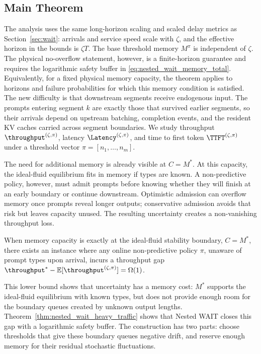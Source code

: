 \subsection{Main Theorem}
\label{subsec:nested_main_theorem}

The analysis uses the same long-horizon scaling and scaled delay metrics as Section~\ref{sec:wait}: arrivals and service speed scale with \(\zeta\), and the effective horizon in the bounds is \(\zeta T\). The base threshold memory \(M^\pi\) is independent of \(\zeta\). The physical no-overflow statement, however, is a finite-horizon guarantee and requires the logarithmic safety buffer in \eqref{eq:nested_wait_memory_total}. Equivalently, for a fixed physical memory capacity, the theorem applies to horizons and failure probabilities for which this memory condition is satisfied. The new difficulty is that downstream segments receive endogenous input. The prompts entering segment \(k\) are exactly those that survived earlier segments, so their arrivals depend on upstream batching, completion events, and the resident KV caches carried across segment boundaries. We study throughput \(\throughput^{(\zeta,\pi)}\), latency \(\Latency^{(\zeta,\pi)}\), and time to first token \(\TTFT^{(\zeta,\pi)}\) under a threshold vector \(\pi=[n_1,\dots,n_m]\).

The need for additional memory is already visible at \(C=M^*\). At this capacity, the ideal-fluid equilibrium fits in memory if types are known. A non-predictive policy, however, must admit prompts before knowing whether they will finish at an early boundary or continue downstream. Optimistic admission can overflow memory once prompts reveal longer outputs; conservative admission avoids that risk but leaves capacity unused. The resulting uncertainty creates a non-vanishing throughput loss.

\begin{proposition}
\label{prop:unknown_lower_bound}
When memory capacity is exactly at the ideal-fluid stability boundary, \(C=M^*\), there exists an instance where any online non-predictive policy \( \pi \), unaware of prompt types upon arrival, incurs a throughput gap \( \throughput^* - \mathbb{E}[\throughput^{(\zeta, \pi)}] = \Omega(1) \).
\end{proposition}

This lower bound shows that uncertainty has a memory cost: \(M^*\) supports the ideal-fluid equilibrium with known types, but does not provide enough room for the boundary queues created by unknown output lengths. Theorem~\ref{thm:nested_wait_heavy_traffic} shows that Nested WAIT closes this gap with a logarithmic safety buffer. The construction has two parts: choose thresholds that give these boundary queues negative drift, and reserve enough memory for their residual stochastic fluctuations.

